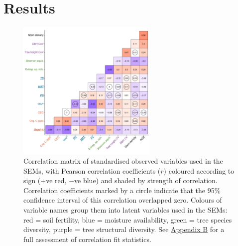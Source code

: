 \documentclass[11pt,a4paper]{article}
\begin{document}

\section{Results}

\begin{figure}[H]
\centering
	\includegraphics[width=0.6\textwidth]{corr_mat}
	\caption{Correlation matrix of standardised observed variables used in the SEMs, with Pearson correlation coefficients ($r$) coloured according to sign ($+$ve red, $-$ve blue) and shaded by strength of correlation. Correlation coefficients marked by a circle indicate that the 95\% confidence interval of this correlation overlapped zero. Colours of variable names group them into latent variables used in the SEMs: red = soil fertility, blue = moisture availability, green = tree species diversity, purple = tree structural diversity. See \hyperref[appendixb]{Appendix B} for a full assessment of correlation fit statistics.}
	\label{corr_mat}
\end{figure}
\end{document}
